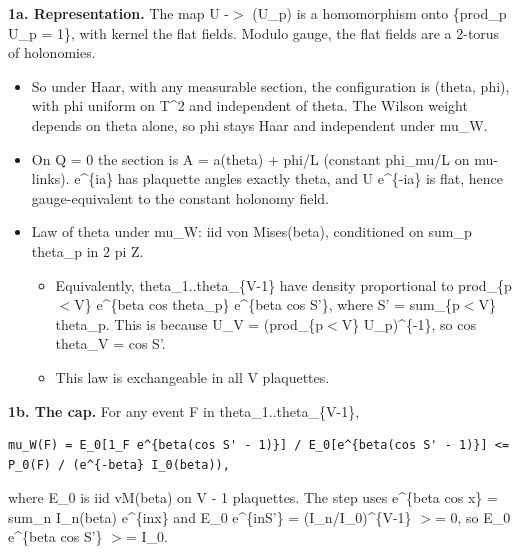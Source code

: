 \documentclass[11pt,a4paper]{article}
\begin{document}
{\bfseries\boldmath 1a. Representation.} The map U -$>$ (U\_p) is a homomorphism onto \{prod\_p U\_p = 1\}, with kernel the flat fields.
Modulo gauge, the flat fields are a 2-torus of holonomies.

\begin{itemize}
\item{} So under Haar, with any measurable section, the configuration is (theta, phi), with phi uniform on T\textasciicircum{}2 and
independent of theta. The Wilson weight depends on theta alone, so phi stays Haar and independent under mu\_W.
\item{} On Q = 0 the section is A = a(theta) + phi/L (constant phi\_mu/L on mu-links). e\textasciicircum{}\{ia\} has plaquette angles exactly
theta, and U e\textasciicircum{}\{-ia\} is flat, hence gauge-equivalent to the constant holonomy field.
\item{} Law of theta under mu\_W: iid von Mises(beta), conditioned on sum\_p theta\_p in 2 pi Z.
\begin{itemize}
\item{} Equivalently, theta\_1..theta\_\{V-1\} have density proportional to prod\_\{p$<$V\} e\textasciicircum{}\{beta cos theta\_p\} e\textasciicircum{}\{beta cos S'\},
where S' = sum\_\{p$<$V\} theta\_p. This is because U\_V = (prod\_\{p$<$V\} U\_p)\textasciicircum{}\{-1\}, so cos theta\_V = cos S'.
\item{} This law is exchangeable in all V plaquettes.
\end{itemize}

\end{itemize}

{\bfseries\boldmath 1b. The cap.} For any event F in theta\_1..theta\_\{V-1\},

\begin{Verbatim}[breaklines=true,breakanywhere=true,fontsize=\small]
mu_W(F) = E_0[1_F e^{beta(cos S' - 1)}] / E_0[e^{beta(cos S' - 1)}] <= P_0(F) / (e^{-beta} I_0(beta)),
\end{Verbatim}

where E\_0 is iid vM(beta) on V - 1 plaquettes. The step uses e\textasciicircum{}\{beta cos x\} = sum\_n I\_n(beta) e\textasciicircum{}\{inx\} and
E\_0 e\textasciicircum{}\{inS'\} = (I\_n/I\_0)\textasciicircum{}\{V-1\} $>$= 0, so E\_0 e\textasciicircum{}\{beta cos S'\} $>$= I\_0.
\end{document}
